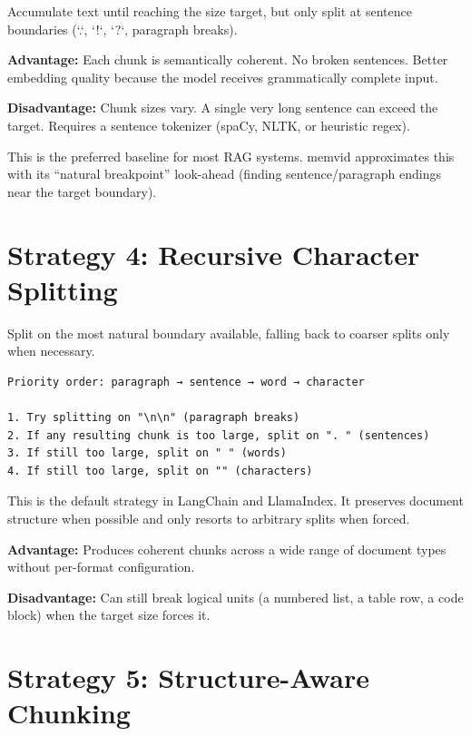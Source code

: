 Accumulate text until reaching the size target, but only split at sentence boundaries
(`.`, `!`, `?`, paragraph breaks).

\textbf{Advantage:} Each chunk is semantically coherent. No broken sentences. Better
embedding quality because the model receives grammatically complete input.

\textbf{Disadvantage:} Chunk sizes vary. A single very long sentence can exceed the target.
Requires a sentence tokenizer (spaCy, NLTK, or heuristic regex).

This is the preferred baseline for most RAG systems. memvid approximates this with its
``natural breakpoint'' look-ahead (finding sentence/paragraph endings near the target
boundary).

\section{Strategy 4: Recursive Character Splitting}

Split on the most natural boundary available, falling back to coarser splits only when
necessary.

\begin{Verbatim}
Priority order: paragraph → sentence → word → character

1. Try splitting on "\n\n" (paragraph breaks)
2. If any resulting chunk is too large, split on ". " (sentences)
3. If still too large, split on " " (words)
4. If still too large, split on "" (characters)
\end{Verbatim}

This is the default strategy in LangChain and LlamaIndex. It preserves document structure
when possible and only resorts to arbitrary splits when forced.

\textbf{Advantage:} Produces coherent chunks across a wide range of document types without
per-format configuration.

\textbf{Disadvantage:} Can still break logical units (a numbered list, a table row, a code
block) when the target size forces it.

\section{Strategy 5: Structure-Aware Chunking}

